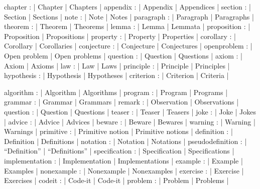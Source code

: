 \DefNoun  chapter           : | Chapter            | Chapters                   |
\DefNoun  appendix          : | Appendix           | Appendices                 |
\DefNoun  section           : | Section            | Sections                   |
\DefNoun  note              : | Note               | Notes                      |
\DefNoun  paragraph         : | Paragraph          | Paragraphs                 |
\DefNoun  theorem           : | Theorem            | Theorems                   |
\DefNoun  lemma             : | Lemma              | Lemmata                    |
\DefNoun  proposition       : | Proposition        | Propositions               |
\DefNoun  property          : | Property           | Properties                 |
\DefNoun  corollary         : | Corollary          | Corollaries                |
\DefNoun  conjecture        : | Conjecture         | Conjectures                |
\DefNoun  openproblem       : | {Open problem}     | {Open problems}            |
\DefNoun  question          : | Question           | Questions                  |
\DefNoun  axiom             : | Axiom              | Axioms                     |
\DefNoun  law               : | Law                | Laws                       |
\DefNoun  principle         : | Principle          | Principles                 |
\DefNoun  hypothesis        : | Hypothesis         | Hypotheses                 |
\DefNoun  criterion         : | Criterion          | Criteria                   |

\DefNoun  algorithm         : | Algorithm          | Algorithms                 |
\DefNoun  program           : | Program            | Programs                   |
\DefNoun  grammar           : | Grammar            | Grammars                   |
\DefNoun  remark            : | Observation        | Observations               |
\DefNoun  question          : | Question           | Questions                  |
\DefNoun  teaser            : | Teaser             | Teasers                    |
\DefNoun  joke              : | Joke               | Jokes                      |
\DefNoun  advice            : | Advice             | Advices                    |
\DefNoun  beware            : | Beware             | Bewares                    |
\DefNoun  warning           : | Warning            | Warnings                   |
\DefNoun  primitive         : | {Primitive notion} | {Primitive notions}        |
\DefNoun  definition        : | Definition         | Definitions                |
\DefNoun  notation          : | Notation           | Notations                  |
\DefNoun  pseudodefinition  : | ``Definition''     | ``Definitions''            |
\DefNoun  specification     : | Specification      | Specifications             |
\DefNoun  implementation    : | Implementation     | Implementations            |
\DefNoun  example           : | Example            | Examples                   |
\DefNoun  nonexample        : | Nonexample         | Nonexamples                |
\DefNoun  exercise          : | Exercise           | Exercises                  |
\DefNoun  codeit            : | Code-it            | Code-it                    |
\DefNoun  problem           : | Problem            | Problems                   |

